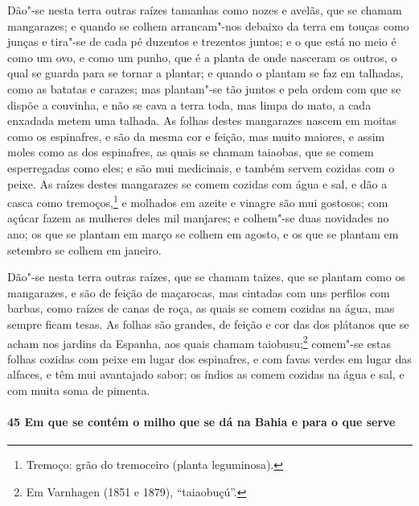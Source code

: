 Dão"-se nesta terra outras raízes tamanhas como nozes e avelãs, que se chamam mangarazes; e
quando se colhem arrancam"-nos debaixo da terra em touças como junças e tira"-se de cada pé
duzentos e trezentos juntos; e o que está no meio é como um ovo, e como um punho, que é a
planta de onde nasceram os outros, o qual se guarda para se tornar a plantar; e quando o
plantam se faz em talhadas, como as batatas e carazes; mas plantam"-se tão juntos e pela
ordem com que se dispõe a couvinha, e não se cava a terra toda, mas limpa do mato, a cada
enxadada metem uma talhada. As folhas destes mangarazes nascem em moitas como os
espinafres, e são da mesma cor e feição, mas muito maiores, e assim moles como as dos
espinafres, as quais se chamam taiaobas, que se comem esperregadas como eles; e são mui
medicinais, e também servem cozidas com o peixe. As raízes destes mangarazes se comem
cozidas com água e sal, e dão a casca como tremoços,\footnote{ Tremoço: grão do tremoceiro
(planta leguminosa).} e molhados em azeite e vinagre são mui gostosos; com açúcar fazem as
mulheres deles mil manjares; e colhem"-se duas novidades no ano; os que se plantam em março
se colhem em agosto, e os que se plantam em setembro se colhem em janeiro.

Dão"-se nesta terra outras raízes, que se chamam taizes, que se 
plantam como os mangarazes, e são de feição de maçarocas, mas cintadas com uns
perfilos com barbas, como raízes de canas de roça, as quais se comem cozidas na água, mas
sempre ficam tesas. As folhas são grandes, de feição e cor das dos plátanos que se acham
nos jardins da Espanha, aos quais chamam taiobusu;\footnote{ Em Varnhagen (1851 e 1879),
``taiaobuçú''.} comem"-se estas folhas cozidas com peixe em lugar dos espinafres, e com
favas verdes em lugar das alfaces, e têm mui avantajado sabor; os índios as comem cozidas
na água e sal, e com muita soma de pimenta.

\paragraph{45 Em que se contém o milho que se dá na Bahia e para o que serve}

